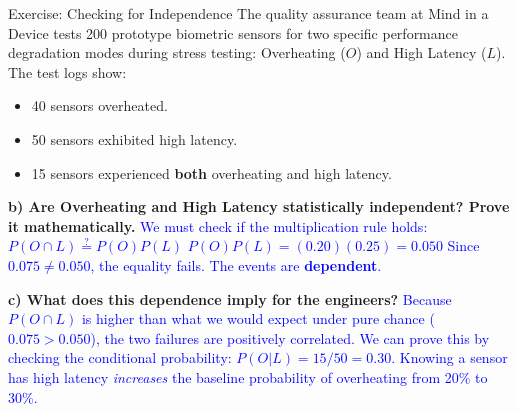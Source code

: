 \documentclass[aspectratio=169]{beamer}
\begin{document}
\begin{frame}{Exercise: Checking for Independence}
    \small
    The quality assurance team at Mind in a Device tests 200 prototype biometric sensors for two specific performance degradation modes during stress testing: Overheating ($O$) and High Latency ($L$). The test logs show:
    \begin{itemize}
        \item 40 sensors overheated.
        \item 50 sensors exhibited high latency.
        \item 15 sensors experienced \textbf{both} overheating and high latency.
    \end{itemize}
    
    \textbf{b) Are Overheating and High Latency statistically independent? Prove it mathematically.} \pause
    \newline \textcolor{blue}{We must check if the multiplication rule holds: $P(O \cap L) \stackrel{?}{=} P(O)P(L)$}
    \newline \textcolor{blue}{$P(O)P(L) = (0.20)(0.25) = 0.050$}
    \newline \textcolor{blue}{Since $0.075 \neq 0.050$, the equality fails. The events are \textbf{dependent}.} \pause

    \textbf{c) What does this dependence imply for the engineers?} \pause
    \newline \textcolor{blue}{Because $P(O \cap L)$ is higher than what we would expect under pure chance ($0.075 > 0.050$), the two failures are positively correlated. We can prove this by checking the conditional probability: $P(O|L) = 15/50 = 0.30$. Knowing a sensor has high latency \emph{increases} the baseline probability of overheating from 20\% to 30\%.}
\end{frame}
\end{document}
